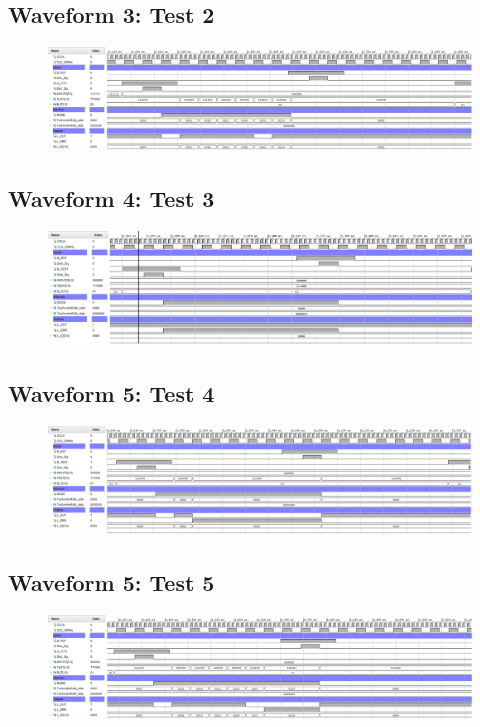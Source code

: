 \documentclass[11pt]{report}
\begin{document}
\subsection*{Waveform 3: Test 2}
\begin{figure}[H]
    \includegraphics[width=\columnwidth]{Reports/Lab4/Assets/3.3.2_test2.png}
\end{figure}

\subsection*{Waveform 4: Test 3}
\begin{figure}[H]
    \includegraphics[width=\columnwidth]{Reports/Lab4/Assets/3.3.2_test3.png}
\end{figure}

\subsection*{Waveform 5: Test 4}
\begin{figure}[H]
    \includegraphics[width=\columnwidth]{Reports/Lab4/Assets/3.3.2_test4.png}
\end{figure}

\subsection*{Waveform 5: Test 5}
\begin{figure}[H]
    \includegraphics[width=\columnwidth]{Reports/Lab4/Assets/3.3.2_test5.png}
\end{figure}
\end{document}

